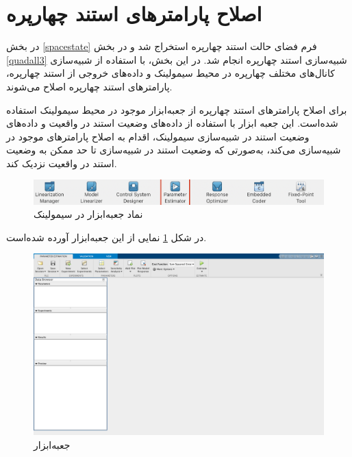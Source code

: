 \section{اصلاح پارامتر‌های  استند چهارپره}\label{parameeter_estimation_section}
در بخش
\ref{spacestate}
فرم فضای حالت استند چهارپره استخراج شد و  در بخش
\ref{quadall3}
شبیه‌سازی استند چهارپره انجام شد.
در این بخش، با استفاده از شبیه‌سازی کانال‌های مختلف چهارپره در محیط سیمولینک و داده‌های خروجی  از استند چهارپره، پارامترهای استند چهارپره اصلاح می‌شوند.

برای اصلاح پارامترهای استند چهارپره از جعبه‌ابزار
موجود در محیط سیمولینک
استفاده شده‌است.
این جعبه ابزار با استفاده از داده‌های وضعیت استند در واقعیت و داده‌های وضعیت استند در شبیه‌سازی سیمولینک، اقدام به اصلاح پارامترهای موجود در شبیه‌سازی می‌کند، به‌صورتی که وضعیت استند در شبیه‌سازی تا حد ممکن به  وضعیت استند در واقعیت نزدیک کند.


	\hspace*{.5cm}
\begin{figure}[H]

	\includegraphics[width=12cm]{../Figures/QuadSimulation/ParameterEstimation/PS_icon.png}
	\centering
	\caption{نماد جعبه‌ابزار
در سیمولینک}
\end{figure}
در شکل
\ref{PS}
نمایی از این جعبه‌ابزار آورده شده‌است.





	\hspace*{-0.5cm}
\begin{figure}[H]
	\includegraphics[width=12cm]{../Figures/QuadSimulation/ParameterEstimation/PS_app.png}
	\centering
	\caption{جعبه‌ابزار
	}
	\label{PS}
\end{figure}

